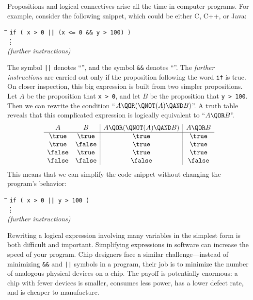 Propositions and logical connectives arise all the time in computer
programs.  For example, consider the following snippet, which could be
either C, C++, or Java:
%
\begin{tabbing}
\hspace{1in} \= \quad\quad \= \quad\quad \= \quad\quad \= \kill
\> \texttt{if ( x > 0 || (x <= 0 \&\& y > 100) )} \\
\> \> \vdots\\
\> \textit{(further instructions)}
\end{tabbing}
%
The symbol \texttt{||} denotes ``\QOR'', and the symbol \texttt{\&\&}
denotes ``\QAND''.  The \textit{further instructions} are carried out
only if the proposition following the word \texttt{if} is true.  On
closer inspection, this big expression is built from two simpler
propositions.  Let $A$ be the proposition that \texttt{x > 0}, and let
$B$ be the proposition that \texttt{y > 100}.  Then we can rewrite the
condition ``$A \QOR (\QNOT(A) \QAND B)$''.
%
A truth table reveals that this complicated expression is logically
equivalent to ``$A \QOR B$''.
\[
\begin{array}{cc|c|c}
A & B &
    A \QOR  (\QNOT(A) \QAND  B) &
    A \QOR  B \\ \hline
\true & \true & \true & \true \\
\true & \false & \true & \true \\
\false & \true & \true & \true \\
\false & \false & \false & \false
\end{array}
\]
%
This means that we can simplify the code snippet without changing the
program's behavior:
%
\begin{tabbing}
\hspace{1in} \= \quad\quad \= \quad\quad \= \quad\quad \= \kill
\> \texttt{if ( x > 0 || y > 100 )} \\
\> \> \vdots\\
\> \textit{(further instructions)}
\end{tabbing}

Rewriting a logical expression involving many variables in the
simplest form is both difficult and important.  Simplifying
expressions in software can increase the speed of your program.  Chip
designers face a similar challenge---instead of minimizing
\texttt{\&\&} and \texttt{||} symbols in a program, their job is to
minimize the number of analogous physical devices on a chip.  The
payoff is potentially enormous: a chip with fewer devices is smaller,
consumes less power, has a lower defect rate, and is cheaper to
manufacture.


